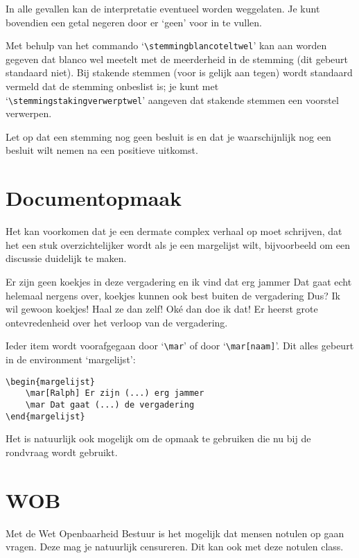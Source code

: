 \documentclass[a4paper]{notulen}
\begin{document}
		In alle gevallen kan de interpretatie eventueel worden weggelaten. Je kunt bovendien een getal negeren door er `geen' voor in te vullen.

		Met behulp van het commando `\lstinline!\stemmingblancoteltwel!' kan aan worden gegeven dat blanco wel meetelt met de meerderheid in de stemming (dit gebeurt standaard niet). Bij stakende stemmen (voor is gelijk aan tegen) wordt standaard vermeld dat de stemming onbeslist is; je kunt met `\lstinline!\stemmingstakingverwerptwel!' aangeven dat stakende stemmen een voorstel verwerpen.
		
		Let op dat een stemming nog geen besluit is en dat je waarschijnlijk nog een besluit wilt nemen na een positieve uitkomst.
	
	\section{Documentopmaak}
		Het kan voorkomen dat je een dermate complex verhaal op moet schrijven,
		dat het een stuk overzichtelijker wordt als je een margelijst wilt, bijvoorbeeld om
		een discussie duidelijk te maken.
		
		
		\begin{margelijst}	
			\mar[Ralph] Er zijn geen koekjes in deze vergadering en ik vind dat erg jammer
			\mar Dat gaat echt helemaal nergens over, koekjes kunnen ook best buiten de vergadering
			\mar[Ralph] Dus? Ik wil gewoon koekjes!
			\mar[\ab] Haal ze dan zelf!
			\mar[Ralph] Ok\'e dan doe ik dat!
			\mar Er heerst grote ontevredenheid over het verloop van de vergadering.
		\end{margelijst}
		
		Ieder item wordt voorafgegaan door `\lstinline!\mar!' of door `\lstinline!\mar[naam]!'. Dit alles gebeurt in
		de environment `margelijst':
		
		\begin{lstlisting}
\begin{margelijst}	
	\mar[Ralph] Er zijn (...) erg jammer
	\mar Dat gaat (...) de vergadering
\end{margelijst}
		\end{lstlisting}
		
		Het is natuurlijk ook mogelijk om de opmaak te gebruiken die nu bij de rondvraag wordt gebruikt.
		
	\section{WOB}
		Met de Wet Openbaarheid Bestuur is het mogelijk dat mensen notulen op gaan vragen. Deze mag je natuurlijk censureren. Dit kan ook met deze notulen class.
		
\end{document}
